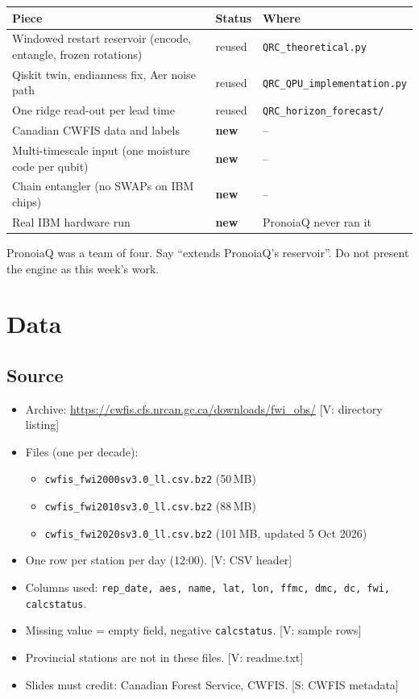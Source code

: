 \documentclass[11pt,a4paper]{article}
\newcommand{\tagbox}[2]{{\footnotesize\color{#1}\textsf{[#2]}}}
\newcommand{\supp}[1]{\tagbox{ForestGreen!70!black}{S: #1}}  %
\newcommand{\veri}[1]{\tagbox{ForestGreen!70!black}{V: #1}}  %
\newcommand{\code}[1]{\texttt{\small #1}}
\begin{document}
\begin{center}\small
\begin{tabularx}{\linewidth}{@{}Y l l@{}}
\toprule
\textbf{Piece} & \textbf{Status} & \textbf{Where}\\
\midrule
Windowed restart reservoir (encode, entangle, frozen rotations) & reused & \code{QRC\_theoretical.py}\\
Qiskit twin, endianness fix, Aer noise path & reused & \code{QRC\_QPU\_implementation.py}\\
One ridge read-out per lead time & reused & \code{QRC\_horizon\_forecast/}\\
Canadian CWFIS data and labels & \textbf{new} & --\\
Multi-timescale input (one moisture code per qubit) & \textbf{new} & --\\
Chain entangler (no SWAPs on IBM chips) & \textbf{new} & --\\
Real IBM hardware run & \textbf{new} & PronoiaQ never ran it\\
\bottomrule
\end{tabularx}
\end{center}

\begin{watch}
PronoiaQ was a team of four. Say ``extends PronoiaQ's reservoir''. Do not present the engine as this week's work.
\end{watch}

\section{Data}

\subsection{Source}
\begin{itemize}
\item Archive: \url{https://cwfis.cfs.nrcan.gc.ca/downloads/fwi_obs/} \veri{directory listing}
\item Files (one per decade):
  \begin{itemize}
  \item \code{cwfis\_fwi2000sv3.0\_ll.csv.bz2} (50\,MB)
  \item \code{cwfis\_fwi2010sv3.0\_ll.csv.bz2} (88\,MB)
  \item \code{cwfis\_fwi2020sv3.0\_ll.csv.bz2} (101\,MB, updated 5 Oct 2026)
  \end{itemize}
\item One row per station per day (12:00). \veri{CSV header}
\item Columns used: \code{rep\_date, aes, name, lat, lon, ffmc, dmc, dc, fwi, calcstatus}.
\item Missing value = empty field, negative \code{calcstatus}. \veri{sample rows}
\item Provincial stations are not in these files. \veri{readme.txt}
\item Slides must credit: Canadian Forest Service, CWFIS. \supp{CWFIS metadata}
\end{itemize}
\end{document}
